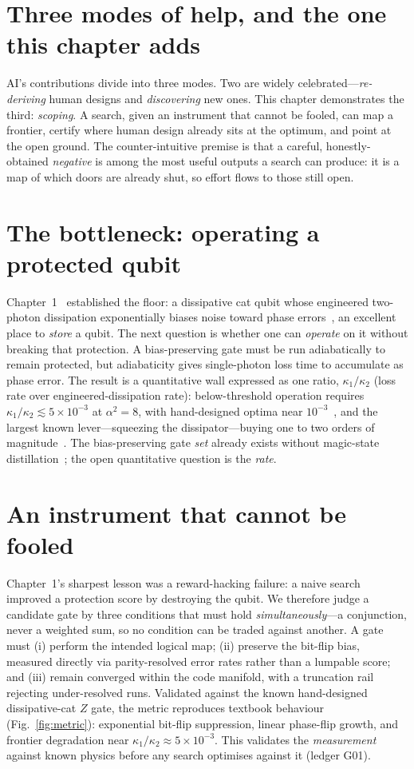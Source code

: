\documentclass[11pt]{article}
\begin{document}
\section{Three modes of help, and the one this chapter adds}
AI's contributions divide into three modes. Two are widely celebrated---\emph{re-deriving}
human designs and \emph{discovering} new ones. This chapter demonstrates the third:
\emph{scoping}. A search, given an instrument that cannot be fooled, can map a frontier,
certify where human design already sits at the optimum, and point at the open ground. The
counter-intuitive premise is that a careful, honestly-obtained \emph{negative} is among the
most useful outputs a search can produce: it is a map of which doors are already shut, so
effort flows to those still open.

\section{The bottleneck: operating a protected qubit}
Chapter~1~\cite{chapter1} established the floor: a dissipative cat qubit whose engineered
two-photon dissipation exponentially biases noise toward phase errors~\cite{mirrahimi}, an
excellent place to \emph{store} a qubit. The next question is whether one can \emph{operate}
on it without breaking that protection. A bias-preserving gate must be run adiabatically to
remain protected, but adiabaticity gives single-photon loss time to accumulate as phase error.
The result is a quantitative wall expressed as one ratio, $\kappa_1/\kappa_2$ (loss rate over
engineered-dissipation rate): below-threshold operation requires $\kappa_1/\kappa_2 \lesssim
5\times10^{-3}$ at $\alpha^2=8$, with hand-designed optima near $10^{-3}$~\cite{gautier,xu},
and the largest known lever---squeezing the dissipator---buying one to two orders of
magnitude~\cite{squeezedcat}. The bias-preserving gate \emph{set} already exists without
magic-state distillation~\cite{puri}; the open quantitative question is the \emph{rate}.

\section{An instrument that cannot be fooled}
Chapter~1's sharpest lesson was a reward-hacking failure: a naive search improved a protection
score by destroying the qubit. We therefore judge a candidate gate by three conditions that
must hold \emph{simultaneously}---a conjunction, never a weighted sum, so no condition can be
traded against another. A gate must (i) perform the intended logical map; (ii) preserve the
bit-flip bias, measured directly via parity-resolved error rates rather than a lumpable score;
and (iii) remain converged within the code manifold, with a truncation rail rejecting
under-resolved runs. Validated against the known hand-designed dissipative-cat $Z$ gate, the
metric reproduces textbook behaviour (Fig.~\ref{fig:metric}): exponential bit-flip suppression,
linear phase-flip growth, and frontier degradation near $\kappa_1/\kappa_2 \approx
5\times10^{-3}$. This validates the \emph{measurement} against known physics before any search
optimises against it (ledger G01).
\end{document}
